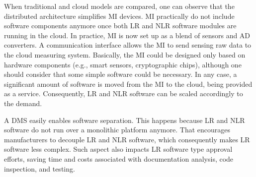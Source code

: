 \documentclass[journal]{IEEEtran}
\begin{document}
When traditional and cloud models are compared, one can observe that the distributed architecture simplifies MI devices.
MI practically do not include software components anymore once both LR and NLR software modules are running in the cloud.
In practice, MI is now set up as a blend of sensors and AD converters.
A communication interface allows the MI to send sensing raw data to the cloud measuring system. 
Basically, the MI could be designed only based on hardware components (e.g., smart sensors, cryptographic chips), although one should consider that some simple software could be necessary.
In any case, a significant amount of software is moved from the MI to the cloud, being provided as a service. 
Consequently, LR and NLR software can be scaled accordingly to the demand.

A DMS easily enables software separation.
This happens because LR and NLR software do not run over a monolithic platform anymore.
That encourages manufacturers to decouple LR and NLR software, which consequently makes LR software less complex.
Such aspect also impacts LR software type approval efforts, saving time and costs associated with documentation analysis, code inspection, and testing.
\end{document}
